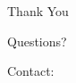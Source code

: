 \documentclass{beamer}
\title[]{}
\author[]{}
\institute{}
\begin{document}
 
 

\begin{frame}
  \titlepage
  
\end{frame}


 

 
 
 

 
 

\begin{frame}{Thank You}
  \begin{center}
    \begin{huge}
      Questions?
    \end{huge}
  \end{center}
  \vspace{40pt}
  Contact:\\
  
\end{frame}


 
\end{document}
